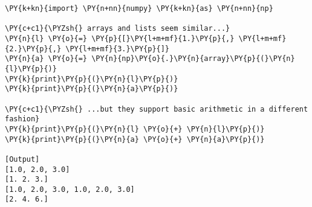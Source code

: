 \begin{Verbatim}[label=\makebox{\url{https://bitbucket.org/lbaldini/programming/src/tip/snippets/numpy\_arrays\_vs\_lists.py}},commandchars=\\\{\}]
\PY{k+kn}{import} \PY{n+nn}{numpy} \PY{k+kn}{as} \PY{n+nn}{np}

\PY{c+c1}{\PYZsh{} arrays and lists seem similar...}
\PY{n}{l} \PY{o}{=} \PY{p}{[}\PY{l+m+mf}{1.}\PY{p}{,} \PY{l+m+mf}{2.}\PY{p}{,} \PY{l+m+mf}{3.}\PY{p}{]}
\PY{n}{a} \PY{o}{=} \PY{n}{np}\PY{o}{.}\PY{n}{array}\PY{p}{(}\PY{n}{l}\PY{p}{)}
\PY{k}{print}\PY{p}{(}\PY{n}{l}\PY{p}{)}
\PY{k}{print}\PY{p}{(}\PY{n}{a}\PY{p}{)}

\PY{c+c1}{\PYZsh{} ...but they support basic arithmetic in a different fashion}
\PY{k}{print}\PY{p}{(}\PY{n}{l} \PY{o}{+} \PY{n}{l}\PY{p}{)}
\PY{k}{print}\PY{p}{(}\PY{n}{a} \PY{o}{+} \PY{n}{a}\PY{p}{)}

[Output]
[1.0, 2.0, 3.0]
[1. 2. 3.]
[1.0, 2.0, 3.0, 1.0, 2.0, 3.0]
[2. 4. 6.]
\end{Verbatim}
